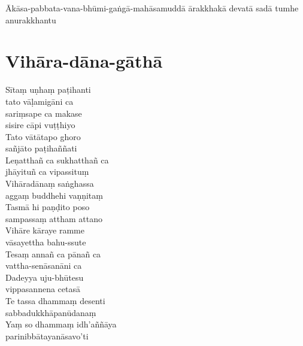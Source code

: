 Ākāsa-pabbata-vana-bhūmi-gaṅgā-mahāsamuddā ārakkhakā
devatā sadā tumhe anurakkhantu


\section{Vihāra-dāna-gāthā}

\begin{paritta}
  Sītaṃ uṇhaṃ paṭihanti\\\vin tato vāḷamigāni ca\\
  sariṃsape ca makase\\\vin sisire cāpi vuṭṭhiyo\\
  Tato vātātapo ghoro\\\vin sañjāto paṭihaññati\\
  Leṇatthañ ca sukhatthañ ca\\\vin jhāyituñ ca vipassituṃ\\
  Vihāradānaṃ saṅghassa\\\vin aggaṃ buddhehi vaṇṇitaṃ\\
  Tasmā hi paṇḍito poso\\\vin sampassaṃ attham attano\\
  Vihāre kāraye ramme\\\vin vāsayettha bahu-ssute\\
  Tesaṃ annañ ca pānañ ca\\\vin vattha-senāsanāni ca\\
  Dadeyya uju-bhūtesu\\\vin vippasannena cetasā\\
  Te tassa dhammaṃ desenti\\\vin sabbadukkhāpanūdanaṃ\\
  Yaṃ so dhammaṃ idh'aññāya\\\vin parinibbātayanāsavo'ti
\end{paritta}




